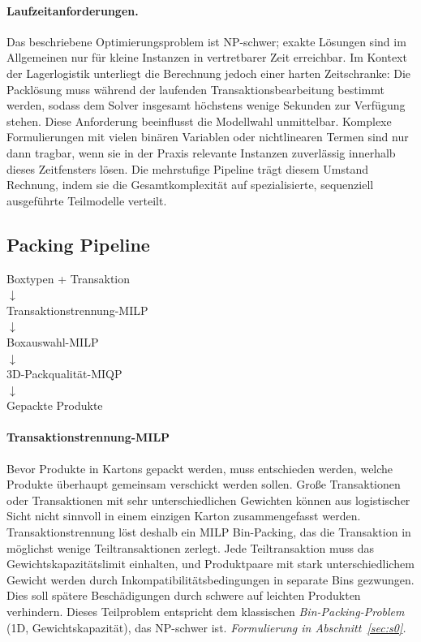 \documentclass[10pt]{article}
\begin{document}
\paragraph{Laufzeitanforderungen.}
Das beschriebene Optimierungsproblem ist NP-schwer; exakte L\"osungen sind
im Allgemeinen nur f\"ur kleine Instanzen in vertretbarer Zeit erreichbar.
Im Kontext der Lagerlogistik unterliegt die Berechnung jedoch einer harten
Zeitschranke: Die Packl\"osung muss w\"ahrend der laufenden Transaktionsbearbeitung
bestimmt werden, sodass dem Solver insgesamt h\"ochstens wenige Sekunden  zur
Verf\"ugung stehen.
Diese Anforderung beeinflusst die Modellwahl unmittelbar. Komplexe
Formulierungen mit vielen bin\"aren Variablen oder nichtlinearen Termen
sind nur dann tragbar, wenn sie in der Praxis relevante Instanzen
zuverl\"assig innerhalb dieses Zeitfensters l\"osen.
Die mehrstufige Pipeline tr\"agt diesem Umstand Rechnung, indem sie die
Gesamtkomplexität auf spezialisierte, sequenziell ausgef\"uhrte Teilmodelle verteilt.

\subsection{Packing Pipeline}
\label{sec:pipe2}


\begin{center}
Boxtypen + Transaktion \\[4pt]
$\downarrow$ \\[4pt]
Transaktionstrennung-MILP \\[4pt]
$\downarrow$ \\[4pt]
Boxauswahl-MILP \\[4pt]
$\downarrow$ \\[4pt]
3D-Packqualit\"at-MIQP \\[4pt]
$\downarrow$ \\[4pt]
Gepackte Produkte
\end{center}

\paragraph{Transaktionstrennung-MILP}
Bevor Produkte in Kartons gepackt werden, muss entschieden werden,
welche Produkte \"uberhaupt gemeinsam verschickt werden sollen.
Gro\ss e Transaktionen oder Transaktionen mit sehr unterschiedlichen
Gewichten k\"onnen aus logistischer Sicht nicht sinnvoll in einem einzigen Karton zusammengefasst werden.
Transaktionstrennung l\"ost deshalb ein MILP Bin-Packing, das die Transaktion in
m\"oglichst wenige Teiltransaktionen zerlegt.
Jede Teiltransaktion muss das Gewichtskapazit\"atslimit einhalten, und Produktpaare mit stark
unterschiedlichem Gewicht werden durch Inkompatibilit\"atsbedingungen
in separate Bins gezwungen. Dies soll sp\"atere Besch\"adigungen durch
schwere auf leichten Produkten verhindern.
Dieses Teilproblem entspricht dem klassischen \emph{Bin-Packing-Problem}
(1D, Gewichtskapazit\"at), das NP-schwer ist.
\emph{Formulierung in Abschnitt~\ref{sec:s0}.}
\end{document}
